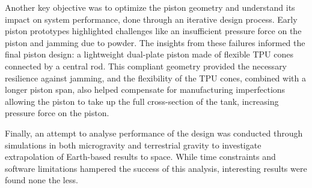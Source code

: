 Another key objective was to optimize the piston geometry and understand its impact on system performance, done through an iterative design process. Early piston prototypes highlighted challenges like an insufficient pressure force on the piston and jamming due to powder. The insights from these failures informed the final piston design: a lightweight dual-plate piston made of flexible TPU cones connected by a central rod. This compliant geometry provided the necessary resilience against jamming, and the flexibility of the TPU cones, combined with a longer piston span, also helped compensate for manufacturing imperfections allowing the piston to take up the full cross-section of the tank, increasing pressure force on the piston. 

Finally, an attempt to analyse performance of the design was conducted through simulations in both microgravity and terrestrial gravity to investigate extrapolation of Earth-based results to space. While time constraints and software limitations hampered the success of this analysis, interesting results were found none the less. 

